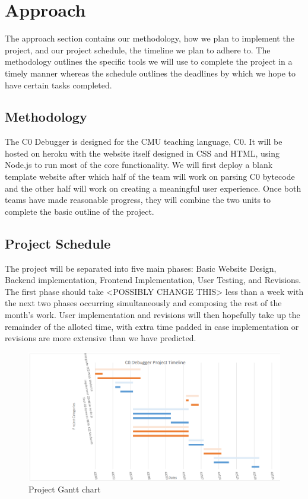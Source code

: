 \documentclass[11pt]{article}
\begin{document}
\section{Approach}
\par
The approach section contains our methodology, how we plan to implement the
project, and our project schedule, the timeline we plan to adhere to.  The
methodology outlines the specific tools we will use to complete the project in
a timely manner whereas the schedule outlines the deadlines by which we hope to
have certain tasks completed.

\subsection{Methodology}
The C0 Debugger is designed for the CMU teaching language, C0.  It will be
hosted on heroku with the website itself designed in CSS and HTML, using
Node.js to run most of the core functionality.  We will first deploy a blank
template website after which half of the team will work on parsing C0 bytecode
and the other half will work on creating a meaningful user experience.  Once
both teams have made reasonable progress, they will combine the two units to
complete the basic outline of the project.

\subsection{Project Schedule}
The project will be separated into five main phases: Basic Website Design,
Backend implementation, Frontend Implementation, User Testing, and Revisions.
The first phase should take <POSSIBLY CHANGE THIS> less than a week with the
next two phases occurring simultaneously and composing the rest of the month's
work.  User implementation and revisions will then hopefully take up the
remainder of the alloted time, with extra time padded in case implementation or
revisions are more extensive than we have predicted.
\begin{figure}[h]
  \centering
  \includegraphics[width=\linewidth]{gantt.png}
  \caption{Project Gantt chart}
  \label{fig:gantt}
\end{figure}
\end{document}
